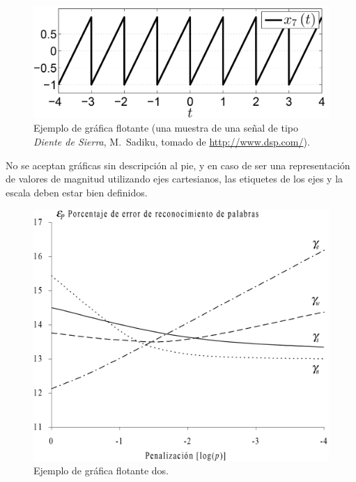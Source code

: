 \documentclass[
10pt,			%
letterpaper,	%
oneside,		%
headinclude, footinclude, %
BCOR5mm, 		%
]{scrartcl}
\begin{document}
\begin{figure}[tb]
	\centering 
	\includegraphics[width=0.6\columnwidth]{fig01} %
	\caption[Ejemplo de gráfica flotante]{Ejemplo de gráfica flotante (una muestra de una señal de tipo \emph{Diente de Sierra}, M.~Sadiku, tomado de \url{http://www.dsp.com/}).} %
	\label{fig:fig01} 
\end{figure}

No se aceptan gráficas sin descripción al pie, y en caso de ser una representación de valores de magnitud utilizando ejes cartesianos, las etiquetes de los ejes y la escala deben estar bien definidos.

\begin{figure}[tbhp]
	\centerline{\includegraphics[scale=0.7]{fig02}} %
	\caption[Ejemplo de gráfica flotante dos]{Ejemplo de gráfica flotante dos.} %
	\label{fig:fig02}
\end{figure}
\end{document}

